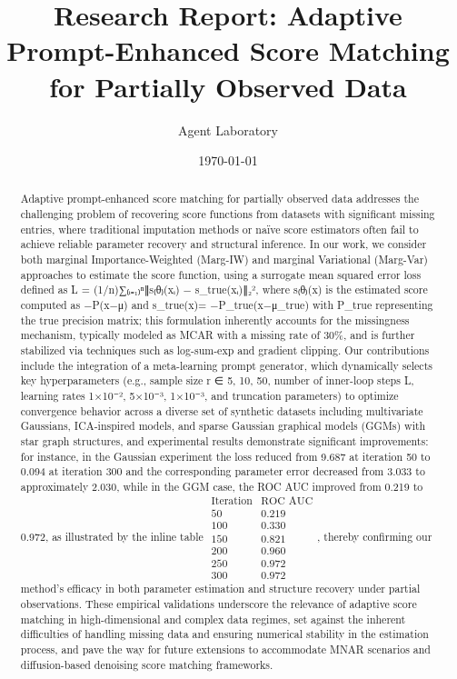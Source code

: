 \documentclass{article}
\title{Research Report: Adaptive Prompt-Enhanced Score Matching for Partially Observed Data}
\author{Agent Laboratory}
\date{\today}
\begin{document}
\maketitle

\begin{abstract}
Adaptive prompt-enhanced score matching for partially observed data addresses the challenging problem of recovering score functions from datasets with significant missing entries, where traditional imputation methods or naïve score estimators often fail to achieve reliable parameter recovery and structural inference. In our work, we consider both marginal Importance-Weighted (Marg-IW) and marginal Variational (Marg-Var) approaches to estimate the score function, using a surrogate mean squared error loss defined as L = (1/n)∑₍ᵢ₌₁₎ⁿ∥s₍θ₎(xᵢ) − s_true(xᵢ)∥₂², where s₍θ₎(x) is the estimated score computed as −P(x−μ) and s_true(x)= −P_true(x−μ_true) with P_true representing the true precision matrix; this formulation inherently accounts for the missingness mechanism, typically modeled as MCAR with a missing rate of 30\%, and is further stabilized via techniques such as log-sum-exp and gradient clipping. Our contributions include the integration of a meta-learning prompt generator, which dynamically selects key hyperparameters (e.g., sample size r ∈ {5, 10, 50}, number of inner-loop steps L, learning rates 1×10⁻², 5×10⁻³, 1×10⁻³, and truncation parameters) to optimize convergence behavior across a diverse set of synthetic datasets including multivariate Gaussians, ICA-inspired models, and sparse Gaussian graphical models (GGMs) with star graph structures, and experimental results demonstrate significant improvements: for instance, in the Gaussian experiment the loss reduced from 9.687 at iteration 50 to 0.094 at iteration 300 and the corresponding parameter error decreased from 3.033 to approximately 2.030, while in the GGM case, the ROC AUC improved from 0.219 to 0.972, as illustrated by the inline table $\begin{array}{c|c}\text{Iteration} & \text{ROC AUC} \\ \hline 50 & 0.219 \\ 100 & 0.330 \\ 150 & 0.821 \\ 200 & 0.960 \\ 250 & 0.972 \\ 300 & 0.972 \end{array}$, thereby confirming our method’s efficacy in both parameter estimation and structure recovery under partial observations. These empirical validations underscore the relevance of adaptive score matching in high-dimensional and complex data regimes, set against the inherent difficulties of handling missing data and ensuring numerical stability in the estimation process, and pave the way for future extensions to accommodate MNAR scenarios and diffusion-based denoising score matching frameworks.
\end{abstract}
\end{document}

